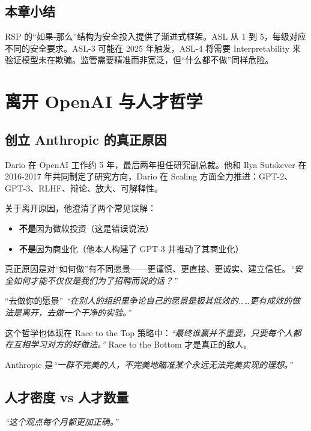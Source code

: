 \documentclass[a4paper]{article}
\begin{document}
\subsection{本章小结}

RSP 的``如果-那么''结构为安全投入提供了渐进式框架。ASL 从 1 到 5，每级对应不同的安全要求。ASL-3 可能在 2025 年触发，ASL-4 将需要 Interpretability 来验证模型未在欺骗。监管需要精准而非宽泛，但``什么都不做''同样危险。

\section{离开 OpenAI 与人才哲学}

\subsection{创立 Anthropic 的真正原因}

Dario 在 OpenAI 工作约 5 年，最后两年担任研究副总裁。他和 Ilya Sutskever 在 2016-2017 年共同制定了研究方向，Dario 在 Scaling 方面全力推进：GPT-2、GPT-3、RLHF、辩论、放大、可解释性。

关于离开原因，他澄清了两个常见误解：
\begin{itemize}
    \item \textbf{不是}因为微软投资（这是错误说法）
    \item \textbf{不是}因为商业化（他本人构建了 GPT-3 并推动了其商业化）
\end{itemize}

真正原因是对``如何做''有不同愿景——更谨慎、更直接、更诚实、建立信任。\textit{``安全如何才能不仅仅是我们为了招聘而说的话？''}

\begin{importantbox}{``去做你的愿景''}
\textit{``在别人的组织里争论自己的愿景是极其低效的……更有成效的做法是离开，去做一个干净的实验。''}

这个哲学也体现在 Race to the Top 策略中：\textit{``最终谁赢并不重要，只要每个人都在互相学习对方的好做法。''} Race to the Bottom 才是真正的敌人。

Anthropic 是\textit{``一群不完美的人，不完美地瞄准某个永远无法完美实现的理想。''}
\end{importantbox}

\subsection{人才密度 vs 人才数量}

\textit{``这个观点每个月都更加正确。''}
\end{document}
